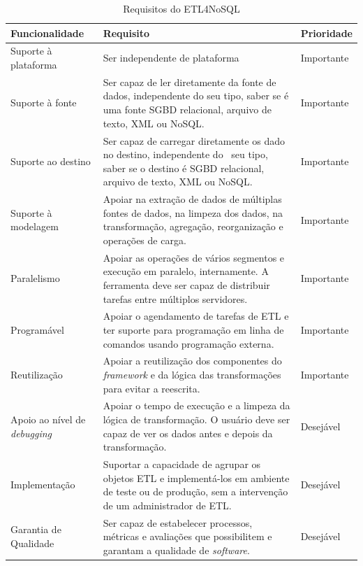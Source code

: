 \begin{table}[h]
	\centering
	\caption{Requisitos do ETL4NoSQL}
	\label{requisitos}
	\begin{tabular}{|p{3cm}| p{10cm}| p{2cm} |}
		\hline
		Funcionalidade & Requisito & Prioridade\\
		\hline
		Suporte à plataforma &  Ser independente de plataforma & Importante\\
		\hline
		Suporte à fonte &  Ser capaz de ler diretamente da fonte de dados, independente do seu tipo, saber se é uma fonte SGBD relacional, arquivo de texto, XML ou NoSQL. & Importante\\
		\hline
		Suporte ao destino & Ser capaz de carregar diretamente os dado no destino, independente do  seu tipo, saber se o destino é SGBD relacional, arquivo de texto, XML ou NoSQL. & Importante\\
		\hline
		Suporte à modelagem & Apoiar na extração de dados de múltiplas fontes de dados, na limpeza dos dados, na transformação, agregação, reorganização e operações de carga. & Importante\\
		\hline
		Paralelismo &Apoiar as operações de vários segmentos e execução em paralelo, internamente. A ferramenta deve ser capaz de distribuir tarefas entre múltiplos servidores. & Importante\\
		\hline
		Programável &Apoiar o agendamento de tarefas de ETL e ter suporte para programação em linha de comandos usando programação externa. & Importante\\
		\hline
		Reutilização & Apoiar a reutilização dos componentes do \textit{framework} e da lógica das transformações para evitar a reescrita. & Importante\\
		\hline
		Apoio ao nível de \textit{debugging} & Apoiar o tempo de execução e a limpeza da lógica de transformação. O usuário deve ser capaz de ver os dados antes e depois da transformação. & Desejável\\
		\hline
		Implementação & Suportar a capacidade de agrupar os objetos ETL e implementá-los em ambiente de teste ou de produção, sem a intervenção de um administrador de ETL. & Desejável\\
		\hline
		Garantia de Qualidade & Ser capaz de estabelecer processos, métricas e avaliações que possibilitem e garantam a qualidade de \textit{software}. & Desejável\\
		\hline
		
		
	\end{tabular}
\end{table}


